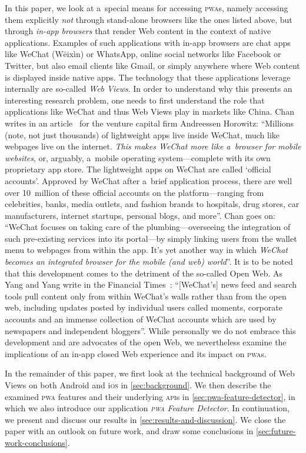 \documentclass[sigconf]{acmart}
\begin{document}
In this paper, we look at a~special means for accessing \textsc{pwa}s,
namely accessing them explicitly \emph{not} through stand-alone browsers
like the ones listed above,
but through \emph{in-app browsers} that render Web content in the context of native applications.
Examples of such applications with in-app browsers are chat apps like WeChat (Wēixìn) or WhatsApp,
online social networks like Facebook or Twitter, but also email clients like Gmail,
or simply anywhere where Web content is displayed inside native apps.
The technology that these applications leverage internally are so-called \emph{Web Views}.
In order to understand why this presents an interesting research problem,
one needs to first understand the role that applications like WeChat
and thus Web Views play in markets like China.
Chan writes in an article~\cite{chan2015wechat} for the venture capital firm Andreessen Horowitz:
``Millions (note, not just thousands) of lightweight apps live inside WeChat,
much like webpages live on the internet.
\emph{This makes WeChat more like a~browser for mobile websites}, or, arguably,
a~mobile operating system---complete with its own proprietary app store.
The lightweight apps on WeChat are called `official accounts'.
Approved by WeChat after a~brief application process,
there are well over 10~million of these official accounts on the platform---ranging
from celebrities, banks, media outlets, and fashion brands to hospitals, drug stores,
car manufacturers, internet startups, personal blogs, and more''.
Chan goes on: ``WeChat focuses on taking care of the plumbing---overseeing
the integration of such pre-existing services into its portal---by
simply linking users from the wallet menu to webpages from within the app.
It's yet another way in which \emph{WeChat
becomes an integrated browser for the mobile (and web) world}''.
It is to be noted that this development comes to the detriment of the so-called Open Web.
As Yang and Yang write in the Financial Times~\cite{yang2017tencent}:
``[WeChat's] news feed and search tools pull content only from within WeChat's walls
rather than from the open web, including updates posted by individual users called moments,
corporate accounts and an immense collection of WeChat accounts
which are used by newspapers and independent bloggers''.
While personally we do not embrace this development
and are advocates of the open Web,
we nevertheless examine the implications of an in-app closed Web experience
and its impact on \textsc{pwa}s. 

In the remainder of this paper, we first look at the technical background of Web Views
on both Android and i\textsc{os} in \autoref{sec:background}.
We then describe the examined \textsc{pwa} features and their underlying \textsc{api}s
in \autoref{sec:pwa-feature-detector}, in which we also introduce
our application \emph{\textsc{pwa} Feature Detector}.
In continuation, we present and discuss our results in \autoref{sec:results-and-discussion}.
We close the paper with an outlook on future work,
and draw some conclusions in \autoref{sec:future-work-conclusions}.
\end{document}
